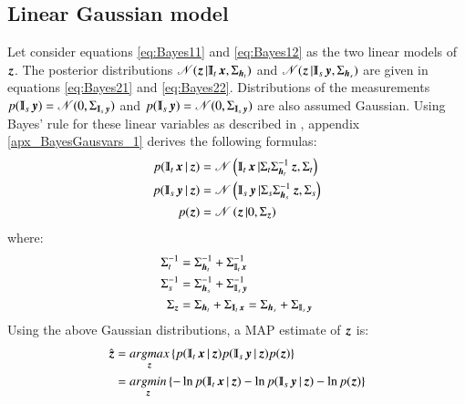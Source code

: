 \subsection{\label{subsec:Linear_Gaussian_model} Linear Gaussian model}
Let consider equations \ref{eq:Bayes11} and \ref{eq:Bayes12} as the two linear models of $ \operatorname{\boldsymbol{z}}  $. The posterior distributions $ \distr(\z |\Interp_t\x ,\Sigma_{\h_t}) $ and $ \distr(\z |\Interp_s\y ,\Sigma_{\h_s}) $ are given in equations \ref{eq:Bayes21} and \ref{eq:Bayes22}. Distributions of the measurements $ p(\Interp_s\y ) = \distr(0,\Sigma_{\Interp_s\y }) $ and $ p(\Interp_s\y ) = \distr(0,\Sigma_{\Interp_s\y }) $ are also assumed Gaussian. Using Bayes' rule for these linear variables as described in \citet{bishop2006pattern}, appendix \ref{apx_BayesGausvars_1} derives the following formulas:
\begin{equation}
\begin{split}
		p(\Interp_t \x |\z ) &= \distr \left(\Interp_t \x |\Sigma_t \Sigma_{\h_t}^{-1} \z ,\Sigma_t \right) \nonumber\\
		p(\Interp_s \y |\z ) &= \distr \left(\Interp_s \y |\Sigma_s \Sigma_{\h_s}^{-1} \z ,\Sigma_s \right) \nonumber\\
		p(\z ) &= \distr \left(\z |0, \Sigma_{\z }\right) 
\end{split}
\label{eq:MAP_linearGauss1}	
\end{equation}
where:
\begin{equation}
\begin{split}
		\Sigma_t^{-1} &= \Sigma_{\h_t}^{-1} + \Sigma_{\Interp_t\x }^{-1} \nonumber\\
		\Sigma_s^{-1} &= \Sigma_{\h_s}^{-1} + \Sigma_{\Interp_s\y }^{-1} \nonumber\\
		\Sigma_{\z } &= \Sigma_{\h_t}+\Sigma_{\Interp_t\x } = \Sigma_{\h_s}+\Sigma_{\Interp_s\y }
\end{split}		
\label{eq:MAP_linearGauss2}	
\end{equation}
Using the above Gaussian distributions, a MAP estimate of $ \operatorname{\boldsymbol{z}}  $ is:
\begin{eqnarray}
\begin{split}
	\hat{\z } &= \underset{\z }{argmax} \left\lbrace  p(\Interp_t\x |\z )p(\Interp_s\y |\z )p(\z ) \right\rbrace \nonumber\\
	&= \underset{\z }{argmin} \left\lbrace -\ln p(\Interp_t\x |\z ) -\ln p(\Interp_s\y |\z ) -\ln p(\z ) \right\rbrace
\end{split}		
\label{eq:MAP_linearGauss3}
\end{eqnarray}

